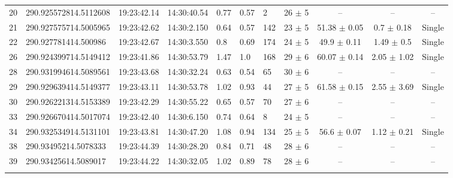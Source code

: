 \documentclass[longauth]{aa} %
\begin{document}
\begin{appendix}
\begin{table}[htbp!]
\begin{tabular}{llllllllccc}
20  &  290.925572814.5112608  &  19:23:42.14  &  14:30:40.54  &  0.77  &  0.57  &  2  &  26 $\pm$ 5  &  --  &  --  &  -- \\
21  &  290.927575714.5005965  &  19:23:42.62  &  14:30:2.150  &  0.64  &  0.57  &  142  &  23 $\pm$ 5  &  51.38 $\pm$ 0.05  &  0.7 $\pm$ 0.18  &  Single \\
22  &  290.927781414.500986  &  19:23:42.67  &  14:30:3.550  &  0.8  &  0.69  &  174  &  24 $\pm$ 5  &  49.9 $\pm$ 0.11  &  1.49 $\pm$ 0.5  &  Single \\
26  &  290.924399714.5149412  &  19:23:41.86  &  14:30:53.79  &  1.47  &  1.0  &  168  &  29 $\pm$ 6  &  60.07 $\pm$ 0.14  &  2.05 $\pm$ 1.02  &  Single \\
28  &  290.931994614.5089561  &  19:23:43.68  &  14:30:32.24  &  0.63  &  0.54  &  65  &  30 $\pm$ 6  &  --  &  --  &  -- \\
29  &  290.929639414.5149377  &  19:23:43.11  &  14:30:53.78  &  1.02  &  0.93  &  44  &  27 $\pm$ 5  &  61.58 $\pm$ 0.15  &  2.55 $\pm$ 3.69  &  Single \\
30  &  290.926221314.5153389  &  19:23:42.29  &  14:30:55.22  &  0.65  &  0.57  &  70  &  27 $\pm$ 6  &  --  &  --  &  -- \\
33  &  290.926670414.5017074  &  19:23:42.40  &  14:30:6.150  &  0.74  &  0.64  &  8  &  24 $\pm$ 5  &  --  &  --  &  -- \\
34  &  290.932534914.5131101  &  19:23:43.81  &  14:30:47.20  &  1.08  &  0.94  &  134  &  25 $\pm$ 5  &  56.6 $\pm$ 0.07  &  1.12 $\pm$ 0.21  &  Single \\
38  &  290.93495214.5078333  &  19:23:44.39  &  14:30:28.20  &  0.84  &  0.71  &  48  &  28 $\pm$ 6  &  --  &  --  &  -- \\
39  &  290.93425614.5089017  &  19:23:44.22  &  14:30:32.05  &  1.02  &  0.89  &  78  &  28 $\pm$ 6  &  --  &  --  &  -- \\
\hline \noalign {\smallskip}
\end{tabular}
\end{table}



\end{appendix}
\end{document}
